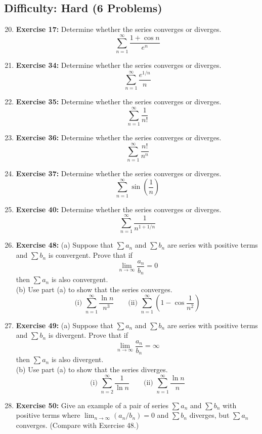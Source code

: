 \documentclass{article}
\begin{document}
\hrulefill
\vspace{1em}

\subsection*{Difficulty: Hard (6 Problems)}
\begin{enumerate}
    \setcounter{enumi}{19} %
    \item \textbf{Exercise 17:} Determine whether the series converges or diverges.
    \[ \sum_{n=1}^{\infty} \frac{1+\cos n}{e^n} \]
    \item \textbf{Exercise 34:} Determine whether the series converges or diverges.
    \[ \sum_{n=1}^{\infty} \frac{e^{1/n}}{n} \]
    \item \textbf{Exercise 35:} Determine whether the series converges or diverges.
    \[ \sum_{n=1}^{\infty} \frac{1}{n!} \]
    \item \textbf{Exercise 36:} Determine whether the series converges or diverges.
    \[ \sum_{n=1}^{\infty} \frac{n!}{n^n} \]
    \item \textbf{Exercise 37:} Determine whether the series converges or diverges.
    \[ \sum_{n=1}^{\infty} \sin(\frac{1}{n}) \]
    \item \textbf{Exercise 40:} Determine whether the series converges or diverges.
    \[ \sum_{n=1}^{\infty} \frac{1}{n^{1+1/n}} \]
    \item \textbf{Exercise 48:}
    (a) Suppose that $\sum a_n$ and $\sum b_n$ are series with positive terms and $\sum b_n$ is convergent. Prove that if
    \[ \lim_{n \to \infty} \frac{a_n}{b_n} = 0 \]
    then $\sum a_n$ is also convergent.\\
    (b) Use part (a) to show that the series converges.
    \[ \text{(i) } \sum_{n=1}^{\infty} \frac{\ln n}{n^3} \qquad \text{(ii) } \sum_{n=1}^{\infty} \left(1 - \cos \frac{1}{n^2}\right) \]

    \item \textbf{Exercise 49:}
    (a) Suppose that $\sum a_n$ and $\sum b_n$ are series with positive terms and $\sum b_n$ is divergent. Prove that if
    \[ \lim_{n \to \infty} \frac{a_n}{b_n} = \infty \]
    then $\sum a_n$ is also divergent.\\
    (b) Use part (a) to show that the series diverges.
    \[ \text{(i) } \sum_{n=2}^{\infty} \frac{1}{\ln n} \qquad \text{(ii) } \sum_{n=1}^{\infty} \frac{\ln n}{n} \]

    \item \textbf{Exercise 50:} Give an example of a pair of series $\sum a_n$ and $\sum b_n$ with positive terms where $\lim_{n \to \infty} (a_n / b_n) = 0$ and $\sum b_n$ diverges, but $\sum a_n$ converges. (Compare with Exercise 48.)


\end{enumerate}
\end{document}
